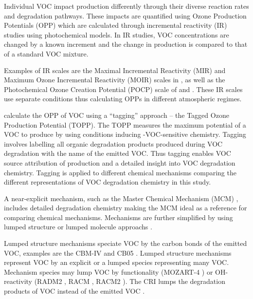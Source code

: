 Individual VOC impact  production differently through their diverse reaction rates and degradation pathways. 
These impacts are quantified using Ozone Production Potentials (OPP) which are calculated through incremental reactivity (IR) studies using photochemical models. 
In IR studies, VOC concentrations are changed by a known increment and the change in  production is compared to that of a standard VOC mixture. 

Examples of IR scales are the Maximal Incremental Reactivity (MIR) and Maximum Ozone Incremental Reactivity (MOIR) scales in \citet{Carter:1994}, as well as the Photochemical Ozone Creation Potential (POCP) scale of \citet{Derwent:1996} and \citet{Derwent:1998}. 
These IR scales use separate  conditions thus calculating OPPs in different atmospheric regimes.

\citet{Butler:2011} calculate the OPP of VOC using a ``tagging'' approach -- the Tagged Ozone Production Potential (TOPP). 
The TOPP measures the maximum potential of a VOC to produce  by using  conditions inducing -VOC-sensitive chemistry.
Tagging involves labelling all organic degradation products produced during VOC degradation with the name of the emitted VOC.
Thus tagging enables VOC source attribution of  production and a detailed insight into VOC degradation chemistry.
Tagging is applied to different chemical mechanisms comparing the different representations of VOC degradation chemistry in this study. 

A near-explicit mechanism, such as the Master Chemical Mechanism (MCM) \citep{Jenkin:2003, Saunders:2003, Bloss:2005}, includes detailed degradation chemistry making the MCM ideal as a reference for comparing chemical mechanisms.
Mechanisms are further simplified by using lumped structure or lumped molecule approachs \citep{Dodge:2000}. 

Lumped structure mechanisms speciate VOC by the carbon bonds of the emitted VOC, examples are the CBM-IV \citep{Gery:1989} and CB05 \citep{Yarwood:2005}.
Lumped structure mechanisms represent VOC by an explicit or a lumped species representing many VOC. 
Mechanism species may lump VOC by functionality (MOZART-4 \citep{Emmons:2010}) or OH-reactivity (RADM2 \citep{Stockwell:1990}, RACM \citep{Stockwell:1997}, RACM2 \citep{Goliff:2013}).
The CRI lumps the degradation products of VOC instead of the emitted VOC \citep{Jenkin:2008}.

